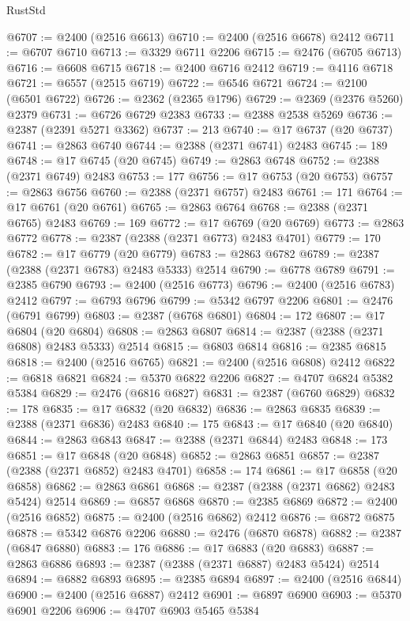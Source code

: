 \begin{lexlean}{RustStd}
\begin{coremodule}
{\begin{coremodule}
{{{{{{{{{{{{{{{{{{{{{{{{{{{{{{{{{{{{{{{{{{{{{{{{{{@6707 := @2400 (@2516 @6613)
@6710 := @2400 (@2516 @6678) @2412
@6711 := @6707 @6710
@6713 := @3329 @6711 @2206
@6715 := @2476 (@6705 @6713)
@6716 := @6608 @6715
@6718 := @2400 @6716 @2412
@6719 := @4116 @6718
@6721 := @6557 (@2515 @6719)
@6722 := @6546 @6721
@6724 := @2100 (@6501 @6722)
@6726 := @2362 (@2365 @1796)
@6729 := @2369 (@2376 @5260) @2379
@6731 := @6726 @6729 @2383
@6733 := @2388 @2538 @5269
@6736 := @2387 (@2391 @5271 @3362)
@6737 := 213
@6740 := @17 @6737 (@20 @6737)
@6741 := @2863 @6740
@6744 := @2388 (@2371 @6741) @2483
@6745 := 189
@6748 := @17 @6745 (@20 @6745)
@6749 := @2863 @6748
@6752 := @2388 (@2371 @6749) @2483
@6753 := 177
@6756 := @17 @6753 (@20 @6753)
@6757 := @2863 @6756
@6760 := @2388 (@2371 @6757) @2483
@6761 := 171
@6764 := @17 @6761 (@20 @6761)
@6765 := @2863 @6764
@6768 := @2388 (@2371 @6765) @2483
@6769 := 169
@6772 := @17 @6769 (@20 @6769)
@6773 := @2863 @6772
@6778 := @2387 (@2388 (@2371 @6773) @2483 @4701)
@6779 := 170
@6782 := @17 @6779 (@20 @6779)
@6783 := @2863 @6782
@6789 := @2387 (@2388 (@2371 @6783) @2483 @5333) @2514
@6790 := @6778 @6789
@6791 := @2385 @6790
@6793 := @2400 (@2516 @6773)
@6796 := @2400 (@2516 @6783) @2412
@6797 := @6793 @6796
@6799 := @5342 @6797 @2206
@6801 := @2476 (@6791 @6799)
@6803 := @2387 (@6768 @6801)
@6804 := 172
@6807 := @17 @6804 (@20 @6804)
@6808 := @2863 @6807
@6814 := @2387 (@2388 (@2371 @6808) @2483 @5333) @2514
@6815 := @6803 @6814
@6816 := @2385 @6815
@6818 := @2400 (@2516 @6765)
@6821 := @2400 (@2516 @6808) @2412
@6822 := @6818 @6821
@6824 := @5370 @6822 @2206
@6827 := @4707 @6824 @5382 @5384
@6829 := @2476 (@6816 @6827)
@6831 := @2387 (@6760 @6829)
@6832 := 178
@6835 := @17 @6832 (@20 @6832)
@6836 := @2863 @6835
@6839 := @2388 (@2371 @6836) @2483
@6840 := 175
@6843 := @17 @6840 (@20 @6840)
@6844 := @2863 @6843
@6847 := @2388 (@2371 @6844) @2483
@6848 := 173
@6851 := @17 @6848 (@20 @6848)
@6852 := @2863 @6851
@6857 := @2387 (@2388 (@2371 @6852) @2483 @4701)
@6858 := 174
@6861 := @17 @6858 (@20 @6858)
@6862 := @2863 @6861
@6868 := @2387 (@2388 (@2371 @6862) @2483 @5424) @2514
@6869 := @6857 @6868
@6870 := @2385 @6869
@6872 := @2400 (@2516 @6852)
@6875 := @2400 (@2516 @6862) @2412
@6876 := @6872 @6875
@6878 := @5342 @6876 @2206
@6880 := @2476 (@6870 @6878)
@6882 := @2387 (@6847 @6880)
@6883 := 176
@6886 := @17 @6883 (@20 @6883)
@6887 := @2863 @6886
@6893 := @2387 (@2388 (@2371 @6887) @2483 @5424) @2514
@6894 := @6882 @6893
@6895 := @2385 @6894
@6897 := @2400 (@2516 @6844)
@6900 := @2400 (@2516 @6887) @2412
@6901 := @6897 @6900
@6903 := @5370 @6901 @2206
@6906 := @4707 @6903 @5465 @5384
}}}}}}}}}}}}}}}}}}}}}}}}}}}}}}}}}}}}}}}}}}}}}}}}}}
\end{coremodule}}
\end{coremodule}
\end{lexlean}
